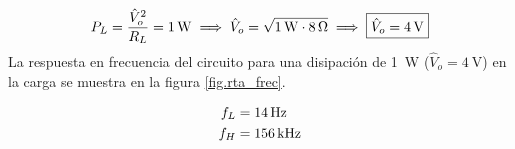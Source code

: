 \begin{equation}
	\centering
	P_L = \frac{ {\hat{V}_o}^{2} }{R_L} = \SI{1}{\watt} \implies \hat{V}_o = \sqrt{\SI{1}{\watt} \cdot \SI{8}{\ohm}} \implies \boxed{\hat{V}_o = \SI{4}{\volt}}
\end{equation}
La respuesta en frecuencia del circuito para una disipación de \SI{1}{\watt} ($\hat{V}_o = \SI{4}{\volt}$) en la carga se muestra en la figura \ref{fig.rta_frec}.




\begin{align}
	\centering
	f_{L} & = \SI{14}{\hertz}\\
	f_H & = \SI{156}{\kilo\hertz}
\end{align}
